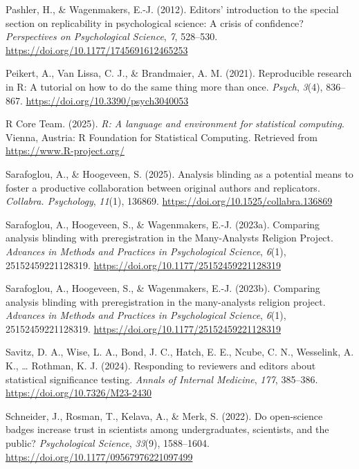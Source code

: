 \documentclass[
  english,
  man,floatsintext]{apa6}
\newlength{\cslhangindent}
\newenvironment{CSLReferences}[2] %
 {\begin{list}{}{%
  \setlength{\itemindent}{0pt}
  \setlength{\leftmargin}{0pt}
  \setlength{\parsep}{0pt}
  \ifodd #1
   \setlength{\leftmargin}{\cslhangindent}
   \setlength{\itemindent}{-1\cslhangindent}
  \fi
  \setlength{\itemsep}{#2\baselineskip}}}
 {\end{list}}
\begin{document}
\begin{CSLReferences}{1}{0}
Pashler, H., \& Wagenmakers, E.-J. (2012). Editors' introduction to the special section on replicability in psychological science: {A} crisis of confidence? \emph{Perspectives on Psychological Science}, \emph{7}, 528--530. \url{https://doi.org/10.1177/1745691612465253}

Peikert, A., Van Lissa, C. J., \& Brandmaier, A. M. (2021). Reproducible research in {R}: {A} tutorial on how to do the same thing more than once. \emph{Psych}, \emph{3}(4), 836--867. \url{https://doi.org/10.3390/psych3040053}

R Core Team. (2025). \emph{R: A language and environment for statistical computing}. Vienna, Austria: R Foundation for Statistical Computing. Retrieved from \url{https://www.R-project.org/}

Sarafoglou, A., \& Hoogeveen, S. (2025). Analysis blinding as a potential means to foster a productive collaboration between original authors and replicators. \emph{Collabra. Psychology}, \emph{11}(1), 136869. \url{https://doi.org/10.1525/collabra.136869}

Sarafoglou, A., Hoogeveen, S., \& Wagenmakers, E.-J. (2023a). Comparing analysis blinding with preregistration in the {Many-Analysts Religion Project}. \emph{Advances in Methods and Practices in Psychological Science}, \emph{6}(1), 25152459221128319. \url{https://doi.org/10.1177/25152459221128319}

Sarafoglou, A., Hoogeveen, S., \& Wagenmakers, E.-J. (2023b). Comparing analysis blinding with preregistration in the many-analysts religion project. \emph{Advances in Methods and Practices in Psychological Science}, \emph{6}(1), 25152459221128319. \url{https://doi.org/10.1177/25152459221128319}

Savitz, D. A., Wise, L. A., Bond, J. C., Hatch, E. E., Ncube, C. N., Wesselink, A. K., \ldots{} Rothman, K. J. (2024). Responding to reviewers and editors about statistical significance testing. \emph{Annals of Internal Medicine}, \emph{177}, 385--386. \url{https://doi.org/10.7326/M23-2430}

Schneider, J., Rosman, T., Kelava, A., \& Merk, S. (2022). Do open-science badges increase trust in scientists among undergraduates, scientists, and the public? \emph{Psychological Science}, \emph{33}(9), 1588--1604. \url{https://doi.org/10.1177/09567976221097499}


\end{CSLReferences}
\end{document}
